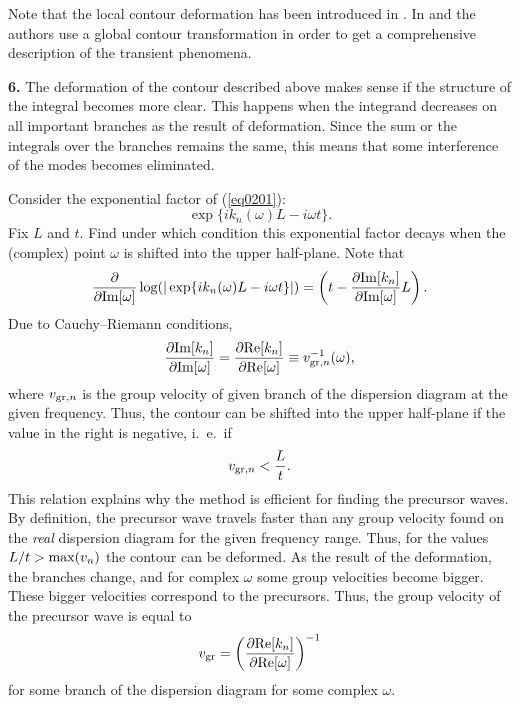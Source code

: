 \documentclass[12pt]{article}
\newcommand{\ptl}{\partial}
\begin{document}
Note that the local contour deformation has been introduced in \cite{Shanin}. 
In \cite{Miklowitz} and \cite{Randles} the authors use a global contour transformation in order to get a comprehensive description of the transient phenomena.  

{\bf 6.} The deformation of the contour described above makes sense if the structure of the 
integral becomes more clear. This happens when the integrand decreases on all important branches as the result of deformation. Since the sum or the integrals over the 
branches remains the same, 
this means that some interference of the modes becomes eliminated.

Consider the exponential factor of (\ref{eq0201}): 
\[
\exp \{ i k_n (\omega) L - i \omega t \}.
\]   
Fix $L$ and $t$. Find under which condition this exponential factor decays when the 
(complex) point $\omega$ is shifted into the upper half-plane.  
Note that 
\begin{equation}
\frac{\ptl}{\ptl {\rm Im}[\omega]} \log (|\exp \{ i k_n (\omega) L - i \omega t \}|) = 
\left( t - \frac{\ptl {\rm Im}[k_n]}{\ptl {\rm Im}[\omega]} L \right) .
\label{eq0206}
\end{equation}
Due to Cauchy--Riemann conditions, 
\[
\frac{\ptl {\rm Im}[k_n]}{\ptl {\rm Im}[\omega]}
=
\frac{\ptl {\rm Re}[k_n]}{\ptl {\rm Re}[\omega]}
\equiv v_{{\rm gr},n}^{-1}(\omega),
\]
where $v_{{\rm gr},n}$ is the group velocity of given branch of the 
dispersion diagram at the given frequency.
Thus, the contour can be shifted into the upper half-plane if the value in the right is negative, i.~e.\ if 
\begin{equation}
v_{{\rm gr},n} < \frac{L}{t}.
\label{eq0207}
\end{equation}  
This relation explains why the method is efficient for finding the precursor 
waves. By definition, the precursor wave travels faster than any group velocity 
found on the 
{\em real\/} dispersion diagram for the given frequency range. 
Thus, for the values 
$L/t > {\rm max}(v_n)$ the contour can be deformed.   
As the result of the deformation, the branches change, and for complex $\omega$ some group velocities become bigger. These bigger velocities correspond to the precursors. 
Thus, the group velocity of the precursor wave is equal to 
\[
v_{\rm gr} = \left(\frac{\ptl {\rm Re}[k_n]}{\ptl {\rm Re}[\omega]} \right)^{-1}
\]
for some branch of the dispersion diagram for some complex $\omega$.
\end{document}
